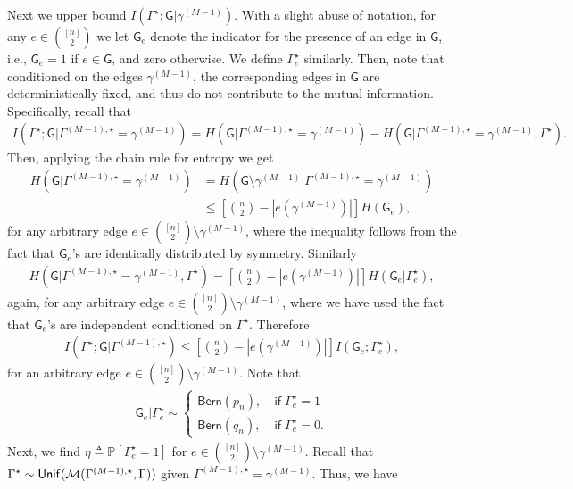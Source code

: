 \documentclass[12pt]{article}
\newcommand {\pr} {\mathbb{P}}
\newcommand{\calM}{{\cal M}}
\newcommand{\p}[1]{\left(#1\right)}
\newcommand{\pp}[1]{\left[#1\right]}
\newcommand{\s}[1]{\mathsf{#1}}
\begin{document}
Next we upper bound $I(\Gamma^\star; \s{G} \vert\gamma^{(M-1)})$. With a slight abuse of notation, for any $e\in\binom{[n]}{2}$ we let $\s{G}_e$ denote the indicator for the presence of an edge in $\s{G}$, i.e., $\s{G}_e=1$ if $e\in\s{G}$, and zero otherwise. We define $\Gamma^\star_e$ similarly. Then, note that conditioned on the edges $\gamma^{(M-1)}$, the corresponding edges in $\s{G}$ are deterministically fixed, and thus do not contribute to the mutual information. Specifically, recall that 
\begin{align}
    I(\Gamma^\star; \s{G} \vert\Gamma^{(M-1),\star}=\gamma^{(M-1)}) = H(\s{G} \vert\Gamma^{(M-1),\star}=\gamma^{(M-1)})-H(\s{G} \vert\Gamma^{(M-1),\star}=\gamma^{(M-1)},\Gamma^\star).
\end{align}
Then, applying the chain rule for entropy we get
\begin{align}
    H(\s{G} \vert\Gamma^{(M-1),\star}=\gamma^{(M-1)}) &= H\p{\left.\s{G}\setminus\gamma^{(M-1)} \right|\Gamma^{(M-1),\star}=\gamma^{(M-1)}}\\
    &\leq \pp{\binom{n}{2}-|e(\gamma^{(M-1)})|}H(\s{G}_e),
\end{align}
for any arbitrary edge $e\in\binom{[n]}{2}\setminus\gamma^{(M-1)}$, where the inequality follows from the fact that $\s{G}_{e}$'s are identically distributed by symmetry. Similarly
\begin{align}
    H(\s{G} \vert\Gamma^{(M-1),\star}=\gamma^{(M-1)},\Gamma^\star)= \pp{\binom{n}{2}-|e(\gamma^{(M-1)})|}H(\s{G}_e\vert\Gamma^\star_e),
\end{align}
again, for any arbitrary edge $e\in\binom{[n]}{2}\setminus\gamma^{(M-1)}$, where we have used the fact that $\s{G}_{e}$'s are independent conditioned on $\Gamma^\star$. Therefore 
\begin{align}
    I(\Gamma^\star; \s{G} \vert\Gamma^{(M-1),\star})\leq \pp{\binom{n}{2}-|e(\gamma^{(M-1)})|}I(\s{G}_e;\Gamma^\star_e),\label{eqn:MutualTotal}
\end{align}
for an arbitrary edge $e\in\binom{[n]}{2}\setminus\gamma^{(M-1)}$. Note that
\begin{align}
    \s{G}_e\vert\Gamma^\star_e\sim\begin{cases}
        \s{Bern}(p_n),\ &\s{if}\;\Gamma^\star_e=1\\
        \s{Bern}(q_n),\ &\s{if}\;\Gamma^\star_e=0.
    \end{cases}
\end{align}
Next, we find $\eta\triangleq\pr[\Gamma^\star_e=1]$ for $e\in\binom{[n]}{2}\setminus\gamma^{(M-1)}$. Recall that $\Gamma^\star\sim\s{Unif}(\calM(\Gamma^{(M-1),\star},\Gamma))$ given $\Gamma^{(M-1),\star}=\gamma^{(M-1)}$. Thus, we have
\end{document}
